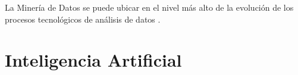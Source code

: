 La Minería de Datos se puede ubicar en el nivel más alto de la evolución de los procesos tecnológicos de análisis de datos \cite{martinez2001mineria}.






\section{Inteligencia Artificial}
